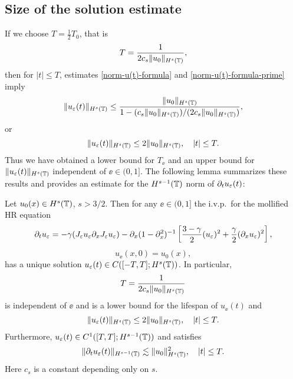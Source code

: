 \subsection{Size of the solution estimate} If we choose  $T=\frac12 T_0$, that is
%
\begin{equation} 
\label{T-def}
T
=
\frac{1}{2 c_s \|u_0\|_{H^s(\mathbb{T})}},
\end{equation}
%
then for $|t| \le T$, estimates \eqref{norm-u(t)-formula} and
\eqref{norm-u(t)-formula-prime} imply 
%
\begin{equation*} 
\label{u(t)-u(0)-bound}
\|u_\varepsilon(t)\|_{H^s(\mathbb{T})}
\le
\frac{\|u_0\|_{H^s(\mathbb{T})}}{1-(c_s\|u_0\|_{H^s(\mathbb{T})})/(2 c_s \|u_0\|_{H^s(\mathbb{T})})},
\end{equation*}
%
or 
%
\begin{equation} 
\|u_\varepsilon(t)\|_{H^s(\mathbb{T})}
\le
2 \|u_0\|_{H^s(\mathbb{T})},
\quad 
|t| \le T.
\end{equation}
%
Thus we have obtained a lower bound for $T_\ee$ and an upper bound for
$\|u_\varepsilon(t)\|_{H^s(\mathbb{T})}$ independent of $\ee\in (0, 1]$. The following
lemma summarizes these results and provides an estimate for the
$H^{s-1}(\mathbb{T})$ norm of $\partial_t u_\varepsilon(t)$:
%
%
\begin{lemma}
\label{hr_wp}
Let  $u_0(x) \in  H^s(\mathbb{T})$, $s >3/2$. Then for any $\ee\in (0, 1]$
the i.v.p.\ for the mollified HR equation 
%
\begin{equation} 
\label{hr-moli-2}
\partial_t  u_\varepsilon 
=
-\gamma (J_\varepsilon u_\varepsilon \partial_x  J_\varepsilon  u_\varepsilon) - \partial_x (1-\partial_x^2)^{-1} \left
[\frac{3-\gamma}{2}(u_\varepsilon)^2 + \frac{\gamma}{2}(\partial_x u_\varepsilon)^2
\right ], 
\end{equation} 
%
\begin{equation} 
\label{burgers-moli-data-2} 
u_\ee(x, 0) = u_0 (x),
\end{equation}
%
has a unique solution $u_\varepsilon( t)\in C([-T, T]; H^s(\mathbb{T}))$. 
In particular,
%
\begin{equation} 
\label{life-est}
T
=
\frac{1}{2 c_s \|u_0\|_{H^s(\mathbb{T})}}
\end{equation}
%
is independent of $\ee$ and
is a lower bound for the lifespan of $u_\ee( t)$ and
%
\begin{equation}
\label{u-e-Hs-bound}
\|u_\varepsilon(t)\|_{H^s(\mathbb{T})}
\le
2 \|u_0 \|_{H^s(\mathbb{T})},
\quad
|t| \le T.
\end{equation}
%
Furthermore,  $u_\varepsilon( t)\in C^1([T, T]; H^{s-1}(\mathbb{T}))$ and 
satisfies
\begin{equation}
\label{dt-u-e-Hs-bound}
\|\partial_t u_\varepsilon(t)\|_{H^{s-1}(\mathbb{T})}
\lesssim
\|u_0 \|_{H^s(\mathbb{T})}^2,
\quad
|t| \le T.
\end{equation}
% 
Here  $c_s$ is a constant depending only on $s$.
\end{lemma}
